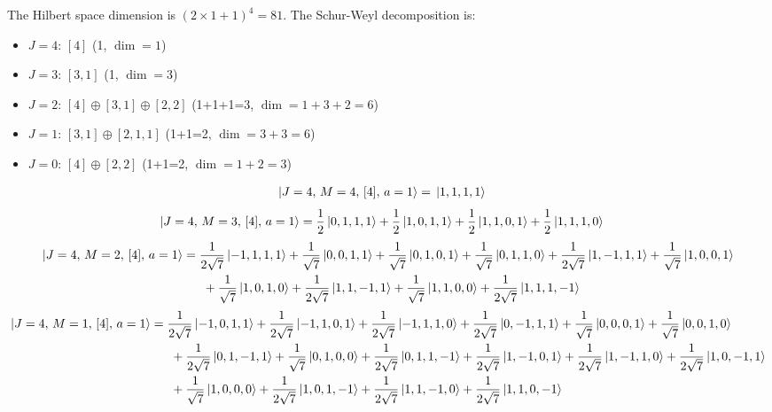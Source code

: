 \documentclass{article}
\begin{document}
The Hilbert space dimension is $(2\times 1 +1)^{4}=81$.
The Schur-Weyl decomposition is:
\begin{itemize}
  \item $J=4$: $[4]$ (1, $\dim = 1$)
  \item $J=3$: $[3,1]$ (1, $\dim = 3$)
  \item $J=2$: $[4] \oplus [3,1] \oplus [2,2]$ (1+1+1=3, $\dim = 1+3+2=6$)
  \item $J=1$: $[3,1] \oplus [2,1,1]$ (1+1=2, $\dim = 3+3=6$)
  \item $J=0$: $[4] \oplus [2,2]$ (1+1=2, $\dim = 1+2=3$)
\end{itemize}

\begin{equation*}
\begin{aligned}
\ket{J=4,\,M=4,\,[4],\,a=1} = \; &\ket{1,1,1,1}
\end{aligned}
\end{equation*}
\begin{equation*}
\begin{aligned}
\ket{J=4,\,M=3,\,[4],\,a=1} = \; &\frac{1}{2} \ket{0,1,1,1} + \frac{1}{2} \ket{1,0,1,1} + \frac{1}{2} \ket{1,1,0,1} + \frac{1}{2} \ket{1,1,1,0}
\end{aligned}
\end{equation*}
{\small
\begin{equation*}
\begin{aligned}
\ket{J=4,\,M=2,\,[4],\,a=1} = \; &\frac{1}{2\sqrt{7}} \ket{-1,1,1,1} + \frac{1}{\sqrt{7}} \ket{0,0,1,1} + \frac{1}{\sqrt{7}} \ket{0,1,0,1} + \frac{1}{\sqrt{7}} \ket{0,1,1,0} + \frac{1}{2\sqrt{7}} \ket{1,-1,1,1} + \frac{1}{\sqrt{7}} \ket{1,0,0,1} \\
  & \; + \frac{1}{\sqrt{7}} \ket{1,0,1,0} + \frac{1}{2\sqrt{7}} \ket{1,1,-1,1} + \frac{1}{\sqrt{7}} \ket{1,1,0,0} + \frac{1}{2\sqrt{7}} \ket{1,1,1,-1}
\end{aligned}
\end{equation*}}
{\small
\begin{equation*}
\begin{aligned}
\ket{J=4,\,M=1,\,[4],\,a=1} = \; &\frac{1}{2\sqrt{7}} \ket{-1,0,1,1} + \frac{1}{2\sqrt{7}} \ket{-1,1,0,1} + \frac{1}{2\sqrt{7}} \ket{-1,1,1,0} + \frac{1}{2\sqrt{7}} \ket{0,-1,1,1} + \frac{1}{\sqrt{7}} \ket{0,0,0,1} + \frac{1}{\sqrt{7}} \ket{0,0,1,0} \\
  & \; + \frac{1}{2\sqrt{7}} \ket{0,1,-1,1} + \frac{1}{\sqrt{7}} \ket{0,1,0,0} + \frac{1}{2\sqrt{7}} \ket{0,1,1,-1} + \frac{1}{2\sqrt{7}} \ket{1,-1,0,1} + \frac{1}{2\sqrt{7}} \ket{1,-1,1,0} + \frac{1}{2\sqrt{7}} \ket{1,0,-1,1} \\
  & \; + \frac{1}{\sqrt{7}} \ket{1,0,0,0} + \frac{1}{2\sqrt{7}} \ket{1,0,1,-1} + \frac{1}{2\sqrt{7}} \ket{1,1,-1,0} + \frac{1}{2\sqrt{7}} \ket{1,1,0,-1}
\end{aligned}
\end{equation*}}
\end{document}
